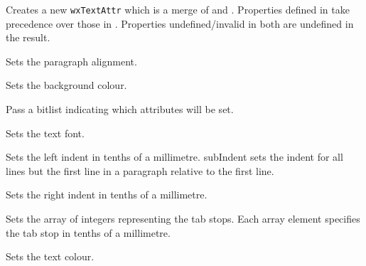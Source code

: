 Creates a new {\tt wxTextAttr} which is a merge of  and 
. Properties defined in  take precedence over those
in . Properties undefined/invalid in both are undefined in the
result.


\label{wxtextattrsetalignment}


Sets the paragraph alignment.


\label{wxtextattrsetbackgroundcolour}


Sets the background colour.


\label{wxtextattrsetflags}


Pass a bitlist indicating which attributes will be set.


\label{wxtextattrsetfont}


Sets the text font.


\label{wxtextattrsetleftindent}


Sets the left indent in tenths of a millimetre.
subIndent sets the indent for all lines but the first line in a paragraph
relative to the first line.


\label{wxtextattrsetrightindent}


Sets the right indent in tenths of a millimetre.


\label{wxtextattrsettabs}


Sets the array of integers representing the tab stops. Each
array element specifies the tab stop in tenths of a millimetre.


\label{wxtextattrsettextcolour}


Sets the text colour.
